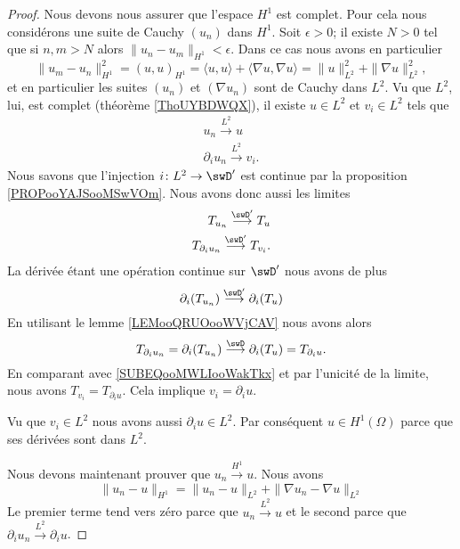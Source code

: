 \begin{proof}
    Nous devons nous assurer que l'espace \( H^1\) est complet. Pour cela nous considérons une suite de Cauchy \( (u_n)\) dans \( H^1\). Soit \( \epsilon>0\); il existe \( N>0\) tel que si \( n,m>N\) alors \( \| u_n-u_m \|_{H^1}<\epsilon\). Dans ce cas nous avons en particulier
    \begin{equation}
        \| u_m-u_n \|_{H^1}^2=(u,u)_{H^1}=\langle u, u\rangle +\langle \nabla u, \nabla u\rangle =\| u \|_{L^2}^2+\| \nabla u \|_{L^2}^2,
    \end{equation}
    et en particulier les suites \( (u_n)\) et \( (\nabla u_n)\) sont de Cauchy dans \( L^2\). Vu que \( L^2\), lui, est complet (théorème \ref{ThoUYBDWQX}), il existe \( u\in L^2\) et \( v_i\in L^2\) tels que
    \begin{subequations}
        \begin{align}
            u_n\stackrel{L^2}{\longrightarrow}u\\
            \partial_iu_n\stackrel{L^2}{\longrightarrow}v_i.
        \end{align}
    \end{subequations}
    Nous savons que l'injection \( i\colon L^2\to \swD'\) est continue par la proposition \ref{PROPooYAJSooMSwVOm}. Nous avons donc aussi les limites
    \begin{subequations}
        \begin{align}
            T_{u_n}\stackrel{\swD'}{\longrightarrow}T_u\\
            T_{\partial_i u_n}\stackrel{\swD'}{\longrightarrow}T_{v_i}.     \label{SUBEQooMWLIooWakTkx}
        \end{align}
    \end{subequations}
    La dérivée étant une opération continue sur \( \swD'\) nous avons de plus
    \begin{equation}
        \partial_i(T_{u_n})\stackrel{\swD'}{\longrightarrow}\partial_i(T_u)
    \end{equation}
    En utilisant le lemme \ref{LEMooQRUOooWVjCAV} nous avons alors
    \begin{equation}
        T_{\partial_iu_n}=\partial_i(T_{u_n})\stackrel{\swD}{\longrightarrow}\partial_i(T_u)=T_{\partial_iu}.
    \end{equation}
    En comparant avec \eqref{SUBEQooMWLIooWakTkx} et par l'unicité de la limite, nous avons \( T_{v_i}=T_{\partial_iu}\). Cela implique \( v_i=\partial_iu\).

    Vu que \( v_i\in L^2\) nous avons aussi \( \partial_iu\in L^2\). Par conséquent \( u\in H^1(\Omega)\) parce que ses dérivées sont dans \( L^2\).

    Nous devons maintenant prouver que \( u_n\stackrel{H^1}{\longrightarrow}u\). Nous avons
    \begin{equation}
        \| u_n-u \|_{H^1}=\| u_n -u\|_{L^2}+\| \nabla u_n-\nabla u \|_{L^2}
    \end{equation}
    Le premier terme tend vers zéro parce que \( u_n\stackrel{L^2}{\longrightarrow}u\) et le second parce que \( \partial_iu_n\stackrel{L^2}{\longrightarrow}\partial_iu\).
\end{proof}

